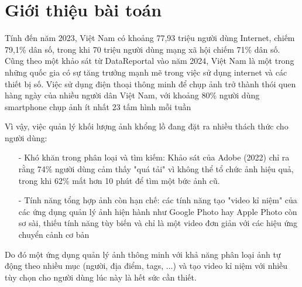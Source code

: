 \section{Giới thiệu bài toán}

Tính đến năm 2023, Việt Nam có khoảng 77,93 triệu người dùng Internet, chiếm 79,1\% dân số, trong khi 70 triệu người dùng mạng xã hội chiếm 71\% dân số\cite{vnetwork2023}. Cũng theo một khảo sát từ DataReportal vào năm 2024, Việt Nam là một trong những quốc gia có sự tăng trưởng mạnh mẽ trong việc sử dụng internet và các thiết bị số\cite{datareportal}. Việc sử dụng điện thoại thông minh để chụp ảnh trở thành thói quen hàng ngày của nhiều người dân Việt Nam, với khoảng 80\% người dùng smartphone chụp ảnh ít nhất 23 tấm hình mỗi tuần \cite{qandme}

Vì vậy, việc quản lý khối lượng ảnh khổng lồ đang đặt ra nhiều thách thức cho người dùng:
\begin{itemize}
	\item[-] Khó khăn trong phân loại và tìm kiếm: Khảo sát của Adobe (2022)\cite{catchlight} chỉ ra rằng 74\% người dùng cảm thấy "quá tải" vì không thể tổ chức ảnh hiệu quả, trong khi 62\% mất hơn 10 phút để tìm một bức ảnh cũ.
	\item[-] Tính năng tổng hợp ảnh còn hạn chế: các tính năng tạo "video kỉ niệm" của các ứng dụng quản lý ảnh hiện hành như Google Photo hay Apple Photo còn sơ sài, thiếu tính năng tùy biến và chỉ là một video đơn giản với các hiệu ứng chuyển cảnh cơ bản\cite{usmobile}
\end{itemize}

Do đó một ứng dụng quản lý ảnh thông minh với khả năng phân loại ảnh tự động theo nhiều mục (người, địa điểm, tags, ...) và tạo video kỉ niệm với nhiều tùy chọn cho người dùng lúc này là hết sức cần thiết.
